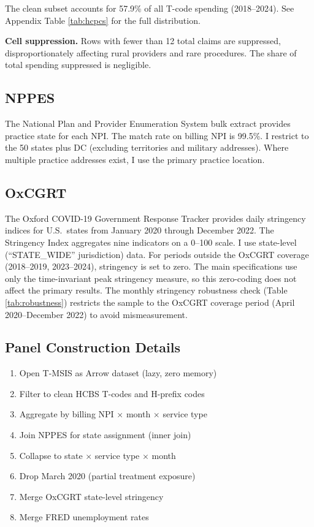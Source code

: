 \documentclass[12pt]{article}
\begin{document}
The clean subset accounts for 57.9\% of all T-code spending (2018--2024). See Appendix Table \ref{tab:hcpcs} for the full distribution.

\textbf{Cell suppression.} Rows with fewer than 12 total claims are suppressed, disproportionately affecting rural providers and rare procedures. The share of total spending suppressed is negligible.

\subsection{NPPES}

The National Plan and Provider Enumeration System bulk extract provides practice state for each NPI. The match rate on billing NPI is 99.5\%. I restrict to the 50 states plus DC (excluding territories and military addresses). Where multiple practice addresses exist, I use the primary practice location.

\subsection{OxCGRT}

The Oxford COVID-19 Government Response Tracker provides daily stringency indices for U.S.\ states from January 2020 through December 2022. The Stringency Index aggregates nine indicators on a 0--100 scale. I use state-level (``STATE\_WIDE'' jurisdiction) data. For periods outside the OxCGRT coverage (2018--2019, 2023--2024), stringency is set to zero. The main specifications use only the time-invariant peak stringency measure, so this zero-coding does not affect the primary results. The monthly stringency robustness check (Table \ref{tab:robustness}) restricts the sample to the OxCGRT coverage period (April 2020--December 2022) to avoid mismeasurement.

\subsection{Panel Construction Details}

\begin{enumerate}
\item Open T-MSIS as Arrow dataset (lazy, zero memory)
\item Filter to clean HCBS T-codes and H-prefix codes
\item Aggregate by billing NPI $\times$ month $\times$ service type
\item Join NPPES for state assignment (inner join)
\item Collapse to state $\times$ service type $\times$ month
\item Drop March 2020 (partial treatment exposure)
\item Merge OxCGRT state-level stringency
\item Merge FRED unemployment rates
\end{enumerate}
\end{document}
